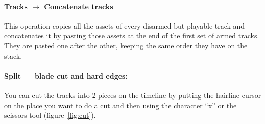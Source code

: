 \paragraph{Tracks $\rightarrow$ Concatenate tracks} This operation copies all the assets of every disarmed but playable
track and concatenates it by pasting those assets at the end of the first set of armed tracks. They are
pasted one after the other, keeping the same order they have on the stack.

\paragraph{Split --- blade cut and hard edges:} You can cut the tracks into 2 pieces on the timeline by putting the hairline cursor on the place you want to do a cut and then using the character “x” or the scissors tool (figure~\ref{fig:cut}). 

